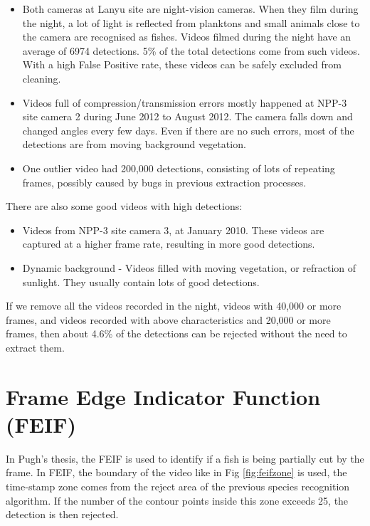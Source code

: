 \documentclass[bsc,frontabs,twoside,fullspacing,parskip,deptreport]{infthesis}
\begin{document}
\begin{itemize}
\item
Both cameras at Lanyu site are night-vision cameras. When they film during the night, a lot of light is reflected from planktons and small animals close to the camera are recognised as fishes. Videos filmed during the night have an average of 6974 detections. 
5\% of the total detections come from such videos. 
With a high False Positive rate, these videos can be safely excluded from cleaning.
\item
Videos full of compression/transmission errors mostly happened at NPP-3 site camera 2 during June 2012 to August 2012. The camera falls down and changed angles every few days. Even if there are no such errors, most of the detections are from moving background vegetation.
\item
One outlier video had 200,000 detections, consisting of lots of repeating frames, possibly caused by bugs in previous extraction processes.
\end{itemize}
There are also some good videos with high detections: 
\begin{itemize}
\item
Videos from NPP-3 site camera 3, at January 2010. These videos are captured at a higher frame rate, resulting in more good detections.
\item
Dynamic background - Videos filled with moving vegetation, or refraction of sunlight. They usually contain lots of good detections.
\end{itemize}

If we remove all the videos recorded in the night, videos with 40,000 or more frames, and videos recorded with above characteristics and 20,000 or more frames, then about 4.6\% of the detections can be rejected without the need to extract them.

\section{Frame Edge Indicator Function (FEIF)}

In Pugh's thesis\cite{Pugh}, the FEIF is used to identify if a fish is being partially cut by the frame. 
In FEIF, the boundary of the video like in Fig \ref{fig:feifzone} is used, the time-stamp zone comes from the reject area of the previous species recognition algorithm. 
If the number of the contour points inside this zone exceeds 25, the detection is then rejected.
\end{document}
